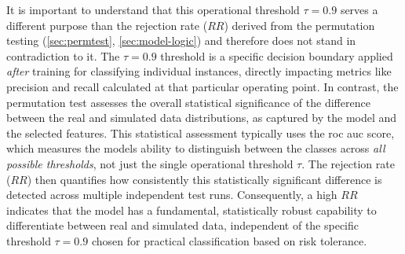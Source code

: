 It is important to understand that this operational threshold $\tau = 0.9$ serves a different purpose than the rejection rate ($RR$) derived from the permutation testing (\autoref{sec:permtest}, \autoref{sec:model-logic}) and therefore does not stand in contradiction to it. The $\tau = 0.9$ threshold is a specific decision boundary applied \textit{after} training for classifying individual instances, directly impacting metrics like precision and recall calculated at that particular operating point. In contrast, the permutation test assesses the overall statistical significance of the difference between the real and simulated data distributions, as captured by the model and the selected features. This statistical assessment typically uses the \gls{roc} \gls{auc} score, which measures the models ability to distinguish between the classes across \textit{all possible thresholds}, not just the single operational threshold $\tau$. The rejection rate ($RR$) then quantifies how consistently this statistically significant difference is detected across multiple independent test runs. Consequently, a high $RR$ indicates that the model has a fundamental, statistically robust capability to differentiate between real and simulated data, independent of the specific threshold $\tau=0.9$ chosen for practical classification based on risk tolerance.